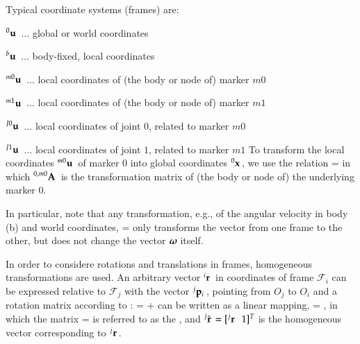 Typical coordinate systems (frames) are:
\bi
  \item $\prescript{0}{}{\mathbf{u}}\,$ $\ldots$ global or world coordinates
  \item $\prescript{b}{}{\mathbf{u}}\,$ $\ldots$ body-fixed, local coordinates
  \item $\prescript{m0}{}{\mathbf{u}}\,$ $\ldots$ local coordinates of (the body or node of) marker $m0$
  \item $\prescript{m1}{}{\mathbf{u}}\,$ $\ldots$ local coordinates of (the body or node of) marker $m1$
  \item $\prescript{J0}{}{\mathbf{u}}\,$ $\ldots$ local coordinates of joint $0$, related to marker $m0$
  \item $\prescript{J1}{}{\mathbf{u}}\,$ $\ldots$ local coordinates of joint $1$, related to marker $m1$
\ei
To transform the local coordinates $\prescript{m0}{}{\mathbf{u}}\,$ of marker 0 into global coordinates $\prescript{0}{}{\mathbf{x}}\,$, we use the relation
\be \label{eq:theory:coordinateSystems:rot}
   =  
\ee
in which $\prescript{0,m0}{}{\mathbf{A}}\,$ is the transformation matrix of (the body or node of) the underlying marker 0.

In particular, note that any transformation, e.g., of the angular velocity in body (b) and world coordinates,
\be
   =  
\ee
only transforms the vector from one frame to the other, but does not change the vector $\mbox{\boldmath $\omega$ \unboldmath}\!\!$ itself.



In order to considere rotations and translations in frames, homogeneous transformations are used.
An arbitrary vector $\prescript{i}{}{\mathbf{r}}\,$ in coordinates of frame $\mathcal{F}_i$ can be expressed relative to $\mathcal{F}_j$ with the vector $\prescript{j}{}{\mathbf{p}_i}\,$, pointing from $O_j$ to $O_i$ and a rotation matrix according to :
\be \label{eq:theory:HT:positionRelation}
   =   + 
\ee
{} can be written as a linear mapping,
\be
   =  , \quad
\ee
in which the matrix
\be
   =  
\ee
is referred to as the , and $\prescript{j}{}{\hat {\mathbf{r}}}\, = [\prescript{j}{}{\mathbf{r}}\, \;\; 1]^T$ is the homogeneous vector corresponding to $\prescript{j}{}{\mathbf{r}}\,$.

